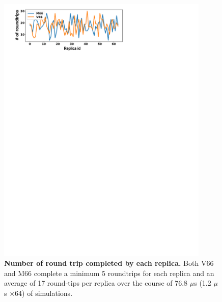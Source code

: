 \documentclass[journal=jacsat,manuscript=article]{achemso}
\begin{document}
\begin{figure}[!ht]
\includegraphics[scale=0.5,width=0.9\textwidth,trim={0 0cm 0 0cm},clip]{../figures/S7.pdf}
\caption{{\bf Number of round trip completed by each replica.} Both V66 and M66 complete a minimum 5 roundtrips for each replica and an average of 17 round-tips per replica over the course of 76.8 $\mu$s (1.2 $\mu$s $\times$64) of simulations.}
\label{S7} 
\end{figure}


\clearpage

\end{document}
